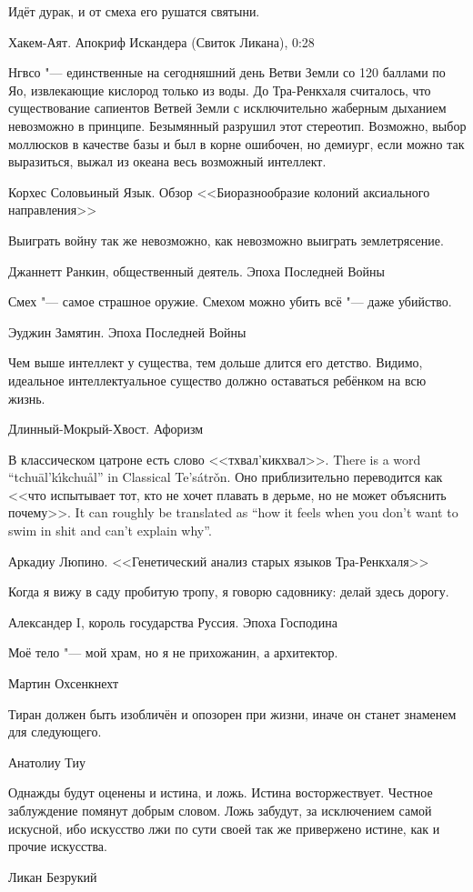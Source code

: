\epigraph
{Идёт дурак, и от смеха его рушатся святыни.}
{Хакем-Аят. Апокриф Искандера (Свиток Ликана), 0:28}

\epigraph
{Нгвсо "--- единственные на сегодняшний день Ветви Земли со 120 баллами по Яо, извлекающие кислород только из воды.
До Тра-Ренкхаля считалось, что существование сапиентов Ветвей Земли с исключительно жаберным дыханием невозможно в принципе.
Безымянный разрушил этот стереотип.
Возможно, выбор моллюсков в качестве базы и был в корне ошибочен, но демиург, если можно так выразиться, выжал из океана весь возможный интеллект.}
{Корхес Соловьиный Язык.
Обзор <<Биоразнообразие колоний аксиального направления>>}

\epigraph
{Выиграть войну так же невозможно, как невозможно выиграть землетрясение.}
{Джаннетт Ранкин, общественный деятель.
Эпоха Последней Войны}

\epigraph
{Смех "--- самое страшное оружие.
Смехом можно убить всё "--- даже убийство.}
{Эуджин Замятин.
Эпоха Последней Войны}

\epigraph
{Чем выше интеллект у существа, тем дольше длится его детство.
Видимо, идеальное интеллектуальное существо должно оставаться ребёнком на всю жизнь.}
{Длинный-Мокрый-Хвост.
Афоризм}

\epigraph{
{В классическом цатроне есть слово <<тхвал'кикхвал>>.}
{There is a word ``tchu\={a}l'k\'{\i}kchu\r{a}l'' in Classical Te's\'{a}tr\v{o}n.}
{Оно приблизительно переводится как <<что испытывает тот, кто не хочет плавать в дерьме, но не может объяснить почему>>.}
{It can roughly be translated as ``how it feels when you don't want to swim in shit and can't explain why''.}
}{
Аркадиу Люпино.
<<Генетический анализ старых языков Тра-Ренкхаля>>
}

\epigraph
{Когда я вижу в саду пробитую тропу, я говорю садовнику: делай здесь дорогу.}
{Александер I, король государства Руссия.
Эпоха Господина}

\epigraph
{Моё тело "--- мой храм, но я не прихожанин, а архитектор.}
{Мартин Охсенкнехт}

\epigraph
{Тиран должен быть изобличён и опозорен при жизни, иначе он станет знаменем для следующего.}
{Анатолиу Тиу}

\epigraph
{Однажды будут оценены и истина, и ложь.
Истина восторжествует.
Честное заблуждение помянут добрым словом.
Ложь забудут, за исключением самой искусной, ибо искусство лжи по сути своей так же привержено истине, как и прочие искусства.}
{Ликан Безрукий}

